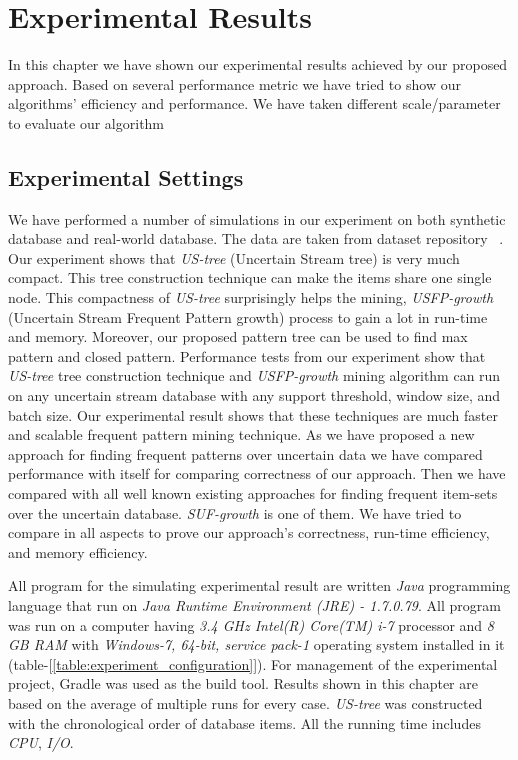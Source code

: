 %
\chapter{Experimental Results}
In this chapter we have shown our experimental results achieved by our proposed approach. Based on several performance metric we have tried to show our algorithms' efficiency and performance. We have taken different scale/parameter to evaluate our algorithm


\section{Experimental Settings}
We have performed a number of simulations in our experiment on both synthetic database and real-world database. The data are taken from dataset repository ~\cite{dataset}. Our experiment shows that \emph{US-tree} (Uncertain Stream tree) is very much compact. This tree construction technique can make the items share one single node. This compactness of \emph{US-tree} surprisingly helps the mining, \emph{USFP-growth} (Uncertain Stream Frequent Pattern growth) process to gain a lot in run-time and memory. Moreover, our proposed pattern tree can be used to find max pattern and closed pattern. Performance tests from our experiment show that \emph{US-tree} tree construction technique and \emph{USFP-growth} mining algorithm can run on any uncertain stream database with any support threshold, window size, and batch size. Our experimental result shows that these techniques are much faster and scalable frequent pattern mining technique. As we have proposed a new approach for finding frequent patterns over uncertain data we have compared performance with itself for comparing correctness of our approach. Then we have compared with all well known existing approaches for finding frequent item-sets over the uncertain database. \emph{SUF-growth} is one of them. We have tried to compare in all aspects to prove our approach's correctness, run-time efficiency, and memory efficiency.

All program for the simulating experimental result are written \emph{Java} programming language that run on \emph{Java Runtime Environment (JRE) - 1.7.0.79}. All program was run on a computer having \emph{3.4 GHz Intel(R) Core(TM) i-7} processor and \emph{8 GB RAM} with \emph{Windows-7, 64-bit, service pack-1} operating system installed in it (table-[\ref{table:experiment_configuration}]). For management of the experimental project, Gradle was used as the build tool. Results shown in this chapter are based on the average of multiple runs for every case. \emph{US-tree} was constructed with the chronological order of database items. All the running time includes \emph{CPU}, \emph{I/O}.\\
